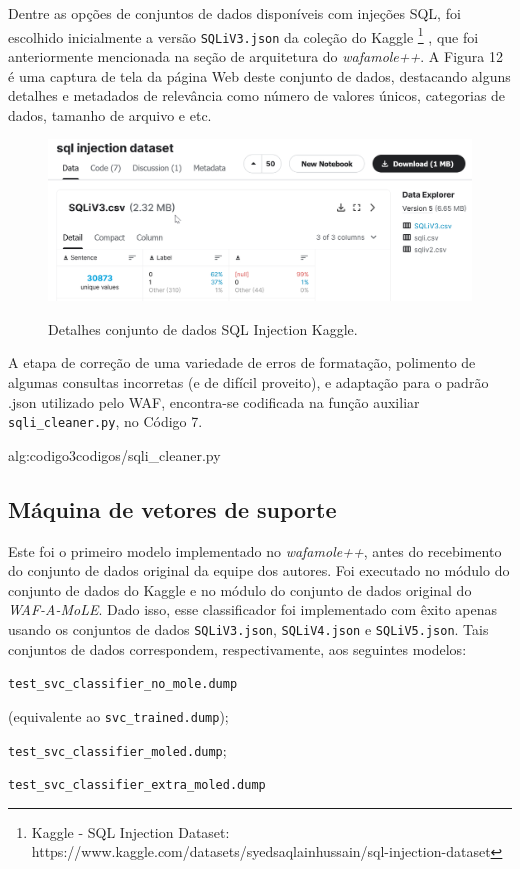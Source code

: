 Dentre as opções de conjuntos de dados disponíveis com injeções SQL, foi escolhido inicialmente a versão \verb+SQLiV3.json+ da coleção do Kaggle \footnote{Kaggle - SQL Injection Dataset: https://www.kaggle.com/datasets/syedsaqlainhussain/sql-injection-dataset} \cite{kaggle_dataset_sql}, que foi anteriormente mencionada na seção de arquitetura do \textit{wafamole++}. A Figura 12 é uma captura de tela da página Web deste conjunto de dados, destacando alguns detalhes e metadados de relevância como número de valores únicos, categorias de dados, tamanho de arquivo e etc.

\begin{figure}[ht]
    \centering
    \caption{Detalhes conjunto de dados SQL Injection Kaggle.}
    \includegraphics[width=16cm]{figuras/sqlInjectionDataset.png} 
    \label{fig:internet} 
\end{figure}

A etapa de correção de uma variedade de erros de formatação, polimento de algumas consultas incorretas (e de difícil proveito), e adaptação para o padrão .json utilizado pelo WAF, encontra-se codificada na função auxiliar \verb+sqli_cleaner.py+, no Código 7.


\label{sec:codigos:sqli_cleaner}
 {alg:codigo3}{codigos/sqli_cleaner.py}
\bigskip


\subsection{Máquina de vetores de suporte}
Este foi o primeiro modelo implementado no \textit{wafamole++}, antes do recebimento do conjunto de dados original da equipe dos autores. Foi executado no módulo do conjunto de dados do Kaggle e no módulo do conjunto de dados original do \textit{WAF-A-MoLE}. Dado isso, esse classificador foi implementado com êxito apenas usando os conjuntos de dados \verb+SQLiV3.json+, \verb+SQLiV4.json+ e \verb+SQLiV5.json+. Tais conjuntos de dados correspondem, respectivamente, aos seguintes modelos:
\begin{alineas}
\item \verb+test_svc_classifier_no_mole.dump+

(equivalente ao \verb+svc_trained.dump+);
\item \verb+test_svc_classifier_moled.dump+;
\item \verb+test_svc_classifier_extra_moled.dump+ 
\end{alineas}

